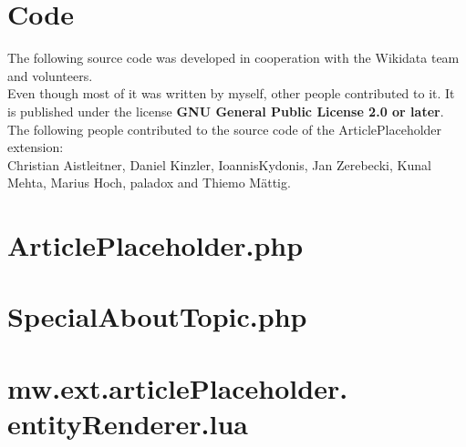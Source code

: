 \chapter{Code}
The following source code was developed in cooperation with the Wikidata team and volunteers. \\
Even though most of it was written by myself, other people contributed to it. It is published under the license \textbf{GNU General Public License 2.0 or later}. \\
The following people contributed to the source code of the ArticlePlaceholder extension: \\
Christian Aistleitner, Daniel Kinzler, IoannisKydonis, Jan Zerebecki, Kunal Mehta, Marius Hoch, paladox and Thiemo M\"attig.



\chapter{ArticlePlaceholder.php}


\chapter{SpecialAboutTopic.php}


\chapter{mw.ext.articlePlaceholder. entityRenderer.lua}


